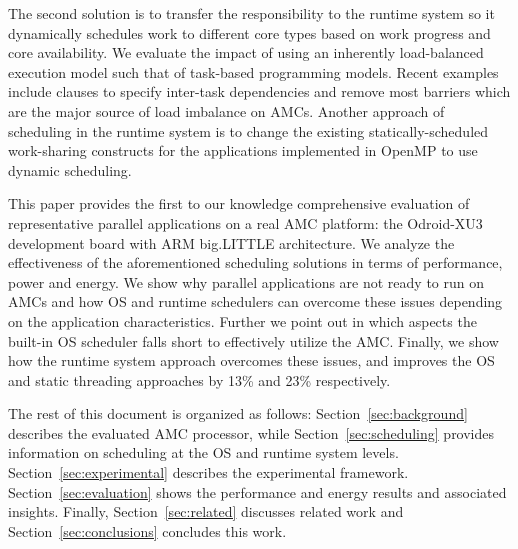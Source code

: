 The second solution is to transfer the responsibility to the runtime system so it dynamically schedules work to different core types based on work progress and core availability. 
We evaluate the impact of using an inherently load-balanced execution model such that of task-based programming models. 
Recent examples~\cite{Ayguade:TPDS2009, OpenMP4.0:Manual2013, OmpSs_PPL11, vectorMulticore, Bauer.2012.SC,rollback,Vandierendonck:PACT2011, Vandierendonck:Hyperq,spawn} include clauses to specify inter-task dependencies and remove most barriers which are the major source of load imbalance on AMCs.
Another approach of scheduling in the runtime system is to change the existing statically-scheduled work-sharing constructs for the applications implemented in OpenMP to use dynamic scheduling. 

This paper provides the first to our knowledge comprehensive evaluation of representative parallel applications on a real AMC platform: the Odroid-XU3 development board with ARM big.LITTLE architecture.
We analyze the effectiveness of the aforementioned scheduling solutions in terms of performance, power and energy.
We show why parallel applications are not ready to run on AMCs and how OS and runtime schedulers can overcome these issues depending on the application characteristics.
Further we point out in which aspects the built-in OS scheduler falls short to effectively utilize the AMC.
Finally, we show how the runtime system approach overcomes these issues, and improves the OS and static threading approaches by 13\% and 23\% respectively.



The rest of this document is organized as follows: Section~\ref{sec:background} describes the evaluated AMC processor, while Section~\ref{sec:scheduling} provides information on 
scheduling at the OS and runtime system levels. 
Section~\ref{sec:experimental} describes the experimental framework. 
Section~\ref{sec:evaluation} shows the performance and energy results and associated insights.%
Finally, Section~\ref{sec:related} discusses related work and Section~\ref{sec:conclusions} concludes this work. 

